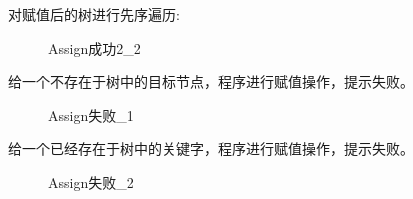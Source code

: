 \documentclass[supercite]{Experimental_Report}
\theoremstyle{definition}
\begin{document}
\noindent
对赋值后的树进行先序遍历:
\begin{figure}[htbp]
	\centering
	\centering
	\caption{Assign成功2\_2}
	\label{fig5-20}
\end{figure}

\clearpage
\noindent
给一个不存在于树中的目标节点，程序进行赋值操作，提示失败。
\begin{figure}[htbp]
	\centering
	\centering
	\caption{Assign失败\_1}
	\label{fig5-21}
\end{figure}

\noindent
给一个已经存在于树中的关键字，程序进行赋值操作，提示失败。
\begin{figure}[htbp]
	\centering
	\centering
	\caption{Assign失败\_2}
	\label{fig5-22}
\end{figure}
\end{document}
